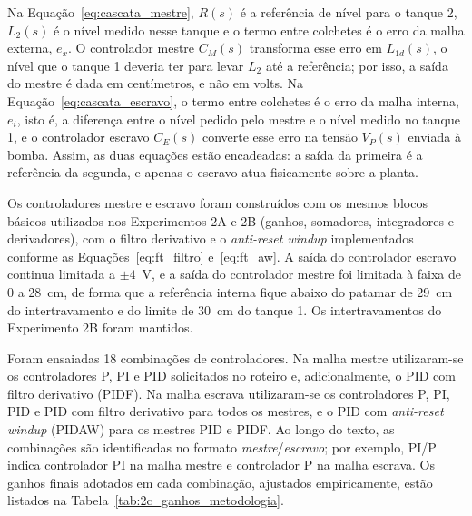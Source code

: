 \documentclass[a4paper,12pt]{article}
\begin{document}
\begin{justify}
    \hspace{4ex}Na Equação~\eqref{eq:cascata_mestre}, $R(s)$ é a referência de nível para o tanque 2, $L_2(s)$ é o nível medido nesse tanque e o termo entre colchetes é o erro da malha externa, $e_x$. O controlador mestre $C_M(s)$ transforma esse erro em $L_{1d}(s)$, o nível que o tanque 1 deveria ter para levar $L_2$ até a referência; por isso, a saída do mestre é dada em centímetros, e não em volts. Na Equação~\eqref{eq:cascata_escravo}, o termo entre colchetes é o erro da malha interna, $e_i$, isto é, a diferença entre o nível pedido pelo mestre e o nível medido no tanque 1, e o controlador escravo $C_E(s)$ converte esse erro na tensão $V_P(s)$ enviada à bomba. Assim, as duas equações estão encadeadas: a saída da primeira é a referência da segunda, e apenas o escravo atua fisicamente sobre a planta.
\end{justify}

\begin{justify}
    \hspace{4ex}Os controladores mestre e escravo foram construídos com os mesmos blocos básicos utilizados nos Experimentos 2A e 2B (ganhos, somadores, integradores e derivadores), com o filtro derivativo e o \textit{anti-reset windup} implementados conforme as Equações~\eqref{eq:ft_filtro} e~\eqref{eq:ft_aw}. A saída do controlador escravo continua limitada a $\pm 4$~V, e a saída do controlador mestre foi limitada à faixa de 0 a 28~cm, de forma que a referência interna fique abaixo do patamar de 29~cm do intertravamento e do limite de 30~cm do tanque 1. Os intertravamentos do Experimento 2B foram mantidos.
\end{justify}

\begin{justify}
    \hspace{4ex}Foram ensaiadas 18 combinações de controladores. Na malha mestre utilizaram-se os controladores P, PI e PID solicitados no roteiro e, adicionalmente, o PID com filtro derivativo (PIDF). Na malha escrava utilizaram-se os controladores P, PI, PID e PID com filtro derivativo para todos os mestres, e o PID com \textit{anti-reset windup} (PIDAW) para os mestres PID e PIDF. Ao longo do texto, as combinações são identificadas no formato \textit{mestre}/\textit{escravo}; por exemplo, PI/P indica controlador PI na malha mestre e controlador P na malha escrava. Os ganhos finais adotados em cada combinação, ajustados empiricamente, estão listados na Tabela~\ref{tab:2c_ganhos_metodologia}.
\end{justify}
\end{document}
